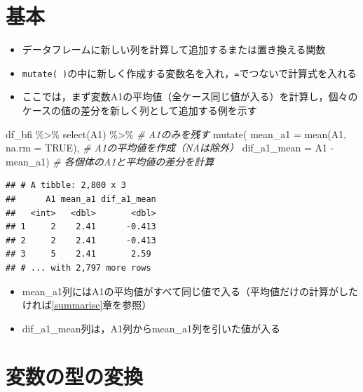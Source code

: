 \documentclass[
  xelatex,ja=standard, b5paper]{bxjsbook}
\newenvironment{Shaded}{\begin{snugshade}}{\end{snugshade}}
\newcommand{\AttributeTok}[1]{\textcolor[rgb]{0.77,0.63,0.00}{#1}}
\newcommand{\CommentTok}[1]{\textcolor[rgb]{0.56,0.35,0.01}{\textit{#1}}}
\newcommand{\ConstantTok}[1]{\textcolor[rgb]{0.00,0.00,0.00}{#1}}
\newcommand{\FunctionTok}[1]{\textcolor[rgb]{0.00,0.00,0.00}{#1}}
\newcommand{\NormalTok}[1]{#1}
\newcommand{\SpecialCharTok}[1]{\textcolor[rgb]{0.00,0.00,0.00}{#1}}
\providecommand{\tightlist}{%
  \setlength{\itemsep}{0pt}\setlength{\parskip}{0pt}}
\begin{document}
\hypertarget{mu-standard}{%
\section{基本}\label{mu-standard}}

\begin{itemize}
\tightlist
\item
  データフレームに新しい列を計算して追加するまたは置き換える関数
\item
  \texttt{mutate(\ )}の中に新しく作成する変数名を入れ，\texttt{=}でつないで計算式を入れる
\item
  ここでは，まず変数A1の平均値（全ケース同じ値が入る）を計算し，個々のケースの値の差分を新しく列として追加する例を示す
\end{itemize}

\begin{Shaded}
\begin{Highlighting}[]
\NormalTok{df\_bfi }\SpecialCharTok{\%\textgreater{}\%} 
  \FunctionTok{select}\NormalTok{(A1) }\SpecialCharTok{\%\textgreater{}\%}                      \CommentTok{\# A1のみを残す}
  \FunctionTok{mutate}\NormalTok{(}
    \AttributeTok{mean\_a1 =} \FunctionTok{mean}\NormalTok{(A1, }\AttributeTok{na.rm =} \ConstantTok{TRUE}\NormalTok{), }\CommentTok{\# A1の平均値を作成（NAは除外）}
    \AttributeTok{dif\_a1\_mean =}\NormalTok{ A1 }\SpecialCharTok{{-}}\NormalTok{ mean\_a1)       }\CommentTok{\# 各個体のA1と平均値の差分を計算}
\end{Highlighting}
\end{Shaded}

\begin{verbatim}
## # A tibble: 2,800 x 3
##      A1 mean_a1 dif_a1_mean
##   <int>   <dbl>       <dbl>
## 1     2    2.41      -0.413
## 2     2    2.41      -0.413
## 3     5    2.41       2.59 
## # ... with 2,797 more rows
\end{verbatim}

\begin{itemize}
\tightlist
\item
  mean\_a1列にはA1の平均値がすべて同じ値で入る（平均値だけの計算がしたければ\ref{summarise}章を参照）
\item
  dif\_a1\_mean列は，A1列からmean\_a1列を引いた値が入る
\end{itemize}

\hypertarget{mu-kata}{%
\section{変数の型の変換}\label{mu-kata}}
\end{document}
